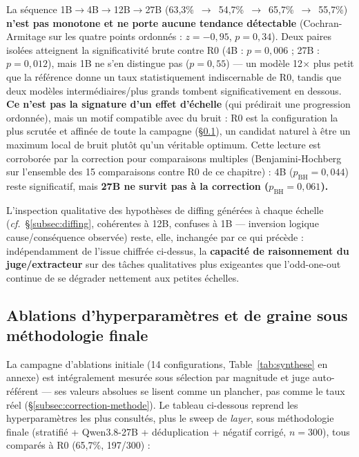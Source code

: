 \documentclass[11pt]{article}
\begin{document}
\begin{resultbox}[Résultat]
La séquence
1B$\to$4B$\to$12B$\to$27B (63,3\%~$\to$~54,7\%~$\to$~65,7\%~$\to$~55,7\%)
\textbf{n'est pas monotone et ne porte aucune tendance détectable}
(Cochran-Armitage sur les quatre points ordonnés : $z=-0{,}95$,
$p=0{,}34$). Deux paires isolées atteignent la significativité brute contre
R0 (4B : $p=0{,}006$ ; 27B : $p=0{,}012$), mais 1B ne s'en distingue pas
($p=0{,}55$) --- un modèle 12$\times$ plus petit que la référence donne un
taux statistiquement indiscernable de R0, tandis que deux modèles
intermédiaires/plus grands tombent significativement en dessous. \textbf{Ce
n'est pas la signature d'un effet d'échelle} (qui prédirait une progression
ordonnée), mais un motif compatible avec du bruit : R0 est la configuration la plus
scrutée et affinée de toute la campagne (\S\ref{subsec:ablations-finales}),
un candidat naturel à être un maximum local de bruit plutôt qu'un véritable
optimum. Cette lecture est corroborée par la correction pour comparaisons
multiples (Benjamini-Hochberg sur l'ensemble des
15 comparaisons contre R0 de ce chapitre) : 4B ($p_\text{BH}=0{,}044$) reste
significatif, mais \textbf{27B ne survit pas à la correction
($p_\text{BH}=0{,}061$).}
\end{resultbox}

L'inspection qualitative des hypothèses de diffing générées à chaque échelle
(\emph{cf.}~\S\ref{subsec:diffing}, cohérentes à 12B, confuses à 1B ---
inversion logique cause/conséquence observée) reste, elle, inchangée par ce
qui précède : indépendamment de l'issue chiffrée ci-dessus, la
\textbf{capacité de raisonnement du juge/extracteur} sur des tâches
qualitatives plus exigeantes que l'odd-one-out continue de se dégrader
nettement aux petites échelles.

\subsection{Ablations d'hyperparamètres et de graine sous méthodologie finale}
\label{subsec:ablations-finales}

La campagne d'ablations initiale (14 configurations, Table~\ref{tab:synthese}
en annexe) est intégralement mesurée sous sélection par magnitude et juge
auto-référent --- ses valeurs absolues se lisent comme un plancher, pas comme
le taux réel (\S\ref{subsec:correction-methode}). Le tableau ci-dessous reprend les
hyperparamètres les plus consultés, plus le sweep de \emph{layer}, sous
méthodologie finale (stratifié + Qwen3.8-27B + déduplication + négatif
corrigé, $n=300$), tous comparés à R0 (65,7\%, 197/300) :
\end{document}
